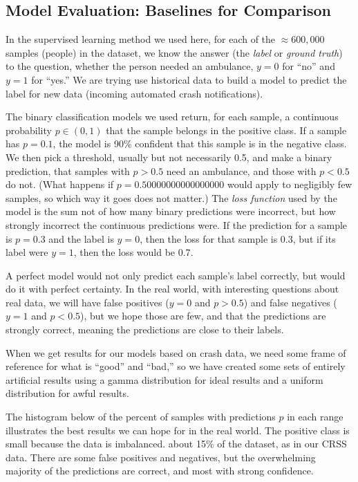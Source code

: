 \subsection{Model Evaluation:  Baselines for Comparison}


In the supervised learning method we used here, for each of the $\approx 600,000$ samples (people) in the dataset, we know the answer (the {\it label} or {\it ground truth}) to the question, whether the person needed an ambulance, $y=0$ for ``no'' and $y=1$ for ``yes.''  We are trying use historical data to build a model to predict the label for new data (incoming automated crash notifications).

The binary classification models we used return, for each sample, a continuous probability $p \in (0,1)$ that the sample belongs in the positive class.   If a sample has $p = 0.1$, the model is 90\% confident that this sample is in the negative class.   We then pick a threshold, usually but not necessarily 0.5, and make a binary prediction, that samples with $p > 0.5$ need an ambulance, and those with $p < 0.5$ do not.   (What happens if $p=0.50000000000000000$ would apply to negligibly few samples, so which way it goes does not matter.) The {\it loss function} used by the model is the sum not of how many binary predictions were incorrect, but how strongly incorrect the continuous predictions were.  If the prediction for a sample is $p = 0.3$ and the label is $y=0$, then the loss for that sample is $0.3$, but if its label were $y=1$, then the loss would be $0.7$.  

A perfect model would not only predict each sample's label correctly, but would do it with perfect certainty.  In the real world, with interesting questions about real data, we will have false positives ($y=0$ and $p>0.5$) and false negatives ($y=1$ and $p<0.5$), but we hope those are few, and that the predictions are strongly correct, meaning the predictions are close to their labels.

When we get results for our models based on crash data, we need some frame of reference for what is ``good'' and ``bad,'' so we have created some sets of entirely artificial results using a gamma distribution for ideal results and a uniform distribution for awful results.  

The histogram below of the percent of samples with predictions $p$ in each range illustrates the best results we can hope for in the real world.  The positive class is small because the data is imbalanced. about 15\% of the dataset, as in our CRSS data.  There are some false positives and negatives, but the overwhelming majority of the predictions are correct, and most with strong confidence.  

